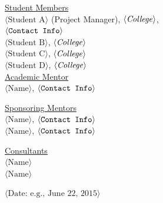 \begin{center}
\vspace{0.35in}
\underline {Student Members}\\
\vspace{5pt}
$\langle \text{Student A}\rangle$ (Project Manager), $\langle \text{\emph{College}}\rangle$,\\ 
\vspace{3pt}
$\langle \text{\texttt{Contact Info}} \rangle$\\
\vspace{5pt}
$\langle \text{Student B}\rangle$, $\langle \text{\emph{College}} \rangle$ \\
\vspace{3pt}
$\langle \text{Student C}\rangle$, $\langle \text{\emph{College}} \rangle$ \\
\vspace{3pt}
$\langle \text{Student D}\rangle$, $\langle \text{\emph{College}} \rangle$ \\

\vspace \shiftdownb
\underline {Academic Mentor} \\
\vspace{5pt}
$\langle \text{Name}\rangle$, $\langle \text{\texttt{Contact Info}} \rangle$

\vspace \shiftdownb
\underline {Sponsoring Mentors}\\
\vspace{5pt}
$\langle \text{Name}\rangle$, $\langle \text{\texttt{Contact Info}} \rangle$\\
\vspace{3pt}
$\langle \text{Name}\rangle$, $\langle \text{\texttt{Contact Info}} \rangle$

\vspace \shiftdownb
\underline {Consultants}\\
\vspace{5pt}
$\langle \text{Name}\rangle$\\
\vspace{3pt}
$\langle \text{Name}\rangle$

\vspace \shiftdowna
$\langle \text{Date: e.g., June 22, 2015}\rangle$ 

\end{center}


